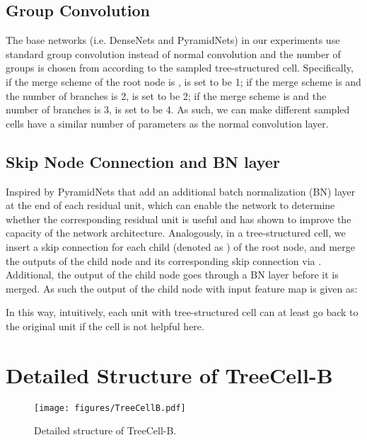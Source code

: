 \documentclass{article}
\begin{document}
\subsection{Group Convolution} 
The base networks (i.e. DenseNets and PyramidNets) in our experiments use standard  group convolution instead of normal  convolution and the number of groups  is chosen from  according to the sampled tree-structured cell. Specifically, if the merge scheme of the root node is ,  is set to be 1; if the merge scheme is  and the number of branches is 2,  is set to be 2; if the merge scheme is  and the number of branches is 3,  is set to be 4. As such, we can make different sampled cells have a similar number of parameters as the normal  convolution layer. 

\subsection{Skip Node Connection and BN layer}
Inspired by PyramidNets \cite{han2016deep} that add an additional batch normalization (BN) \cite{ioffe2015batch} layer at the end of each residual unit, which can enable the network to determine whether the corresponding residual unit is useful and has shown to improve the capacity of the network architecture. Analogously, in a tree-structured cell, we insert a skip connection for each child (denoted as ) of the root node, and merge the outputs of the child node and its corresponding skip connection via . Additional, the output of the child node goes through a BN layer before it is merged. As such the output of the child node  with input feature map  is given as:

In this way, intuitively, each unit with tree-structured cell can at least go back to the original unit if the cell is not helpful here. 

\section{Detailed Structure of TreeCell-B}

\begin{figure}[h]
	\centering
	\texttt{[image: figures/TreeCellB.pdf]}
	\caption{Detailed structure of TreeCell-B.}
	\label{fig:tree-cell-b}
\end{figure}
\end{document}
